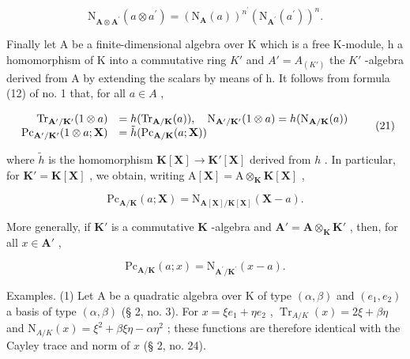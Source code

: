 \[
\mathrm{N} _ {\mathbf {A} \otimes \mathbf {A} ^ {\prime}} (a \otimes a ^ {\prime}) = (\mathrm{N} _ {\mathbf {A}} (a)) ^ {n ^ {\prime}} (\mathrm{N} _ {\mathbf {A} ^ {\prime}} (a ^ {\prime})) ^ {n}.
\]

Finally let A be a finite-dimensional algebra over K which is a free K-module, h a homomorphism of K into a commutative ring \(K'\) and \(A' = A_{(K')}\) the \(K'\) -algebra derived from A by extending the scalars by means of h. It follows from formula (12) of no. 1 that, for all \(a \in A\) ,

\[
\begin{array}{r l} \mathrm{Tr} _ {\mathbf {A} ^ {\prime} / \mathbf {K} ^ {\prime}} (1 \otimes a) & = h (\mathrm{Tr} _ {\mathbf {A} / \mathbf {K}} (a)), \quad \mathrm{N} _ {\mathbf {A} ^ {\prime} / \mathbf {K} ^ {\prime}} (1 \otimes a) = h (\mathrm{N} _ {\mathbf {A} / \mathbf {K}} (a)) \\ \mathrm{Pc} _ {\mathbf {A} ^ {\prime} / \mathbf {K} ^ {\prime}} (1 \otimes a; \mathbf {X}) & = \tilde {h} (\mathrm{Pc} _ {\mathbf {A} / \mathbf {K}} (a; \mathbf {X})) \end{array}\tag{21}
\]

where \(\tilde{h}\) is the homomorphism \(\mathbf{K}[\mathbf{X}] \to \mathbf{K}'[\mathbf{X}]\) derived from \(h\) . In particular, for \(\mathbf{K}' = \mathbf{K}[\mathbf{X}]\) , we obtain, writing \(\mathrm{A}[\mathbf{X}] = \mathrm{A} \otimes_{\mathbf{K}} \mathbf{K}[\mathbf{X}]\) ,

\[
\mathrm{Pc} _ {\mathbf {A} / \mathbf {K}} (a; \mathbf {X}) = \mathrm{N} _ {\mathbf {A} [ \mathbf {X} ] / \mathbf {K} [ \mathbf {X} ]} (\mathbf {X} - a).\tag{22}
\]

More generally, if \(\mathbf{K}'\) is a commutative \(\mathbf{K}\) -algebra and \(\mathbf{A}' = \mathbf{A} \otimes_{\mathbf{K}} \mathbf{K}'\) , then, for all \(x \in \mathbf{A}'\) ,

\[
\mathrm{Pc} _ {\mathbf {A} / \mathbf {K}} (a; x) = \mathrm{N} _ {\mathbf {A} ^ {\prime} / \mathbf {K} ^ {\prime}} (x - a).
\]

Examples. (1) Let A be a quadratic algebra over K of type \((\alpha, \beta)\) and \((e_1, e_2)\) a basis of type \((\alpha, \beta)\) (§ 2, no. 3). For \(x = \xi e_1 + \eta e_2\) , \(\operatorname{Tr}_{A/K}(x) = 2\xi + \beta \eta\) and \(\mathrm{N}_{A/K}(x) = \xi^2 + \beta \xi \eta - \alpha \eta^2\) ; these functions are therefore identical with the Cayley trace and norm of \(x\) (§ 2, no. 24).

